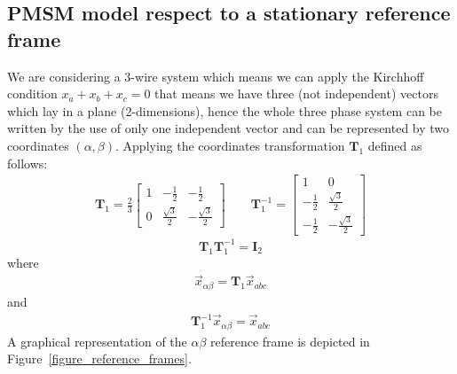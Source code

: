 \documentclass[11pt,a4paper,oneside]{book}
\numberwithin{equation}{section}
\theoremstyle{it}
\theoremstyle{definition}
\begin{document}
\subsection{PMSM model respect to a stationary reference frame}
We are considering a 3-wire system which means we can apply the Kirchhoff 
condition $x_a+x_b+x_c=0$ that means we have three (not independent) vectors 
which lay in a plane (2-dimensions), hence the whole three phase system can be 
written by the use of only one independent vector and can be represented by two 
coordinates $(\alpha,\beta)$.  
Applying the coordinates transformation $\mathbf{T}_1$ defined as follows:
\begin{equation}
	\begin{aligned}
		\mathbf{T}_1 = 
		\frac{2}{3}\begin{bmatrix}
			1 & -\frac{1}{2} & -\frac{1}{2} \\[6pt]
			0 & \frac{\sqrt{3}}{2} & -\frac{\sqrt{3}}{2} 
		\end{bmatrix} \qquad
		\mathbf{T}_1^{-1} = 
		\begin{bmatrix}
			1 & 0 \\[6pt]
			-\frac{1}{2} & \frac{\sqrt{3}}{2} \\[6pt]
			-\frac{1}{2} & -\frac{\sqrt{3}}{2} 
		\end{bmatrix}
	\end{aligned} 
\end{equation}
\begin{equation}
	\mathbf{T}_1\mathbf{T}_1^{-1} = \mathbf{I}_2
\end{equation}
where 
\begin{equation}\label{t1}
	\begin{aligned}
		\vec{x}_{\alpha\beta}=\mathbf{T}_1\vec{x}_{abc}
	\end{aligned} 
\end{equation}
and
\begin{equation}\label{t2}
	\begin{aligned}
		\mathbf{T}_1^{-1}\vec{x}_{\alpha\beta}=\vec{x}_{abc}
	\end{aligned} 
\end{equation}
A graphical representation of the $\alpha\beta$ reference frame is depicted in 
Figure~\ref{figure_reference_frames}.
\end{document}
